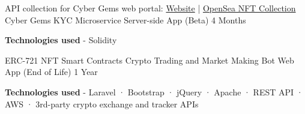 \begin{cventries}
{\begin{cvitems}
      \end{cvitems}
    }
  \cventry
    {API collection for Cyber Gems web portal: \hyperlink{https://cybergems.com/}{Website} | \hyperlink{https://opensea.io/collection/cybergems-io}{OpenSea NFT Collection}} %
    {Cyber Gems KYC Microservice} %
    {Server-side App (Beta)} %
    {4 Months} %
    {
      \begin{cvitems} %
        \item {\textbf{Technologies used} \hspace{0.03cm} - \hspace{0.03cm} Solidity \\}
      \end{cvitems}
    }
  \cventry
    {ERC-721 NFT Smart Contracts} %
    {Crypto Trading and Market Making Bot} %
    {Web App (End of Life)} %
    {1 Year} %
    {
      \begin{cvitems} %
        \item {\textbf{Technologies used} \hspace{0.03cm} - \hspace{0.03cm} Laravel \hspace{0.03cm} · \hspace{0.03cm} Bootstrap \hspace{0.03cm} · \hspace{0.03cm} jQuery \hspace{0.03cm} · \hspace{0.03cm} Apache \hspace{0.03cm} · \hspace{0.03cm} REST API \hspace{0.03cm} · \hspace{0.03cm} AWS \hspace{0.03cm} · \hspace{0.03cm} 3rd-party crypto exchange and tracker APIs \\}
      \end{cvitems}
    }
\end{cventries}
